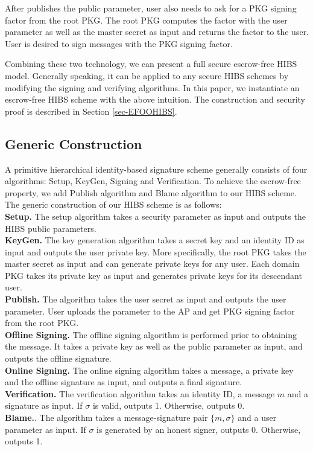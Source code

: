 \documentclass[times]{secauth}
\theoremstyle{definition}
\theoremstyle{remark}
\begin{document}
After publishes the public parameter, user also needs to ask for a PKG signing factor from the root PKG. 
The root PKG computes the factor with the user parameter as well as the master secret as input and returns the factor to the user.
User is desired to sign messages with the PKG signing factor. 
\par 
Combining these two technology, we can present a full secure escrow-free HIBS model. 
Generally speaking, it can be applied to any secure HIBS schemes by modifying the signing and verifying algorithms.
In this paper, we instantiate an escrow-free HIBS scheme with the above intuition. 
The construction and security proof is described in Section \ref{sec-EFOOHIBS}.

\subsection{Generic Construction}
A primitive hierarchical identity-based signature scheme generally consists of four algorithms: Setup, KeyGen, Signing and Verification.
To achieve the escrow-free property, we add Publish algorithm and Blame algorithm to our HIBS scheme.
The generic construction of our HIBS scheme is as follows:
\vspace{0.1cm}
\\
\textbf{Setup.}
The setup algorithm takes a security parameter as input and outputs the HIBS public parameters. 
\vspace{0.1cm}
\\
\textbf{KeyGen.}
The key generation algorithm takes a secret key and an identity ID as input and outputs the user private key. 
More specifically, the root PKG takes the master secret as input and can generate private keys for any user.
Each domain PKG takes its private key as input and generates private keys for its descendant user.
\vspace{0.1cm}
\\
\textbf{Publish.}
The algorithm takes the user secret as input and outputs the user parameter. User uploads the parameter to the AP and get PKG signing factor from the root PKG.
\vspace{0.1cm}
\\
\textbf{Offline Signing.}
The offline signing algorithm is performed prior to obtaining the message. 
It takes a private key as well as the public parameter as input, and outputs the offline signature.
\\
\textbf{Online Signing.}
The online signing algorithm takes a message, a private key and the offline signature as input, and outputs a final signature.
\vspace{0.1cm}
\\
\textbf{Verification.}
The verification algorithm takes an identity $\mathrm{ID}$, a message $m$ and a signature as input.
If $\sigma$ is valid, outputs 1. 
Otherwise, outputs 0.
\vspace{0.1cm}
\\
\textbf{Blame.}. 
The algorithm takes a message-signature pair $\{m, \sigma\}$  and a user parameter as input.
If $\sigma$ is generated by an honest signer, outputs 0.
Otherwise, outputs 1.
\end{document}
